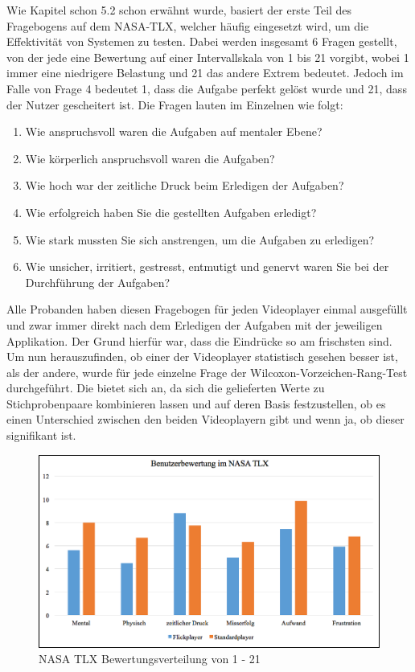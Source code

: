 \documentclass[11pt,a4paper]{report}
\begin{document}
Wie Kapitel schon 5.2 schon erwähnt wurde, basiert der erste Teil des Fragebogens auf dem NASA-TLX, welcher häufig eingesetzt wird, um die Effektivität von Systemen zu testen. Dabei werden insgesamt 6 Fragen gestellt, von der jede eine Bewertung auf einer Intervallskala von 1 bis 21 vorgibt, wobei 1 immer eine niedrigere Belastung und 21 das andere Extrem bedeutet. Jedoch im Falle von Frage 4 bedeutet 1, dass die Aufgabe perfekt gelöst wurde und 21, dass der Nutzer gescheitert ist. Die Fragen lauten im Einzelnen wie folgt:
\begin{enumerate}
\item	Wie anspruchsvoll waren die Aufgaben auf mentaler Ebene?
\item	Wie körperlich anspruchsvoll waren die Aufgaben?
\item	Wie hoch war der zeitliche Druck beim Erledigen der Aufgaben?
\item	Wie erfolgreich haben Sie die gestellten Aufgaben erledigt?
\item	Wie stark mussten Sie sich anstrengen, um die Aufgaben zu erledigen?
\item	Wie unsicher, irritiert, gestresst, entmutigt und genervt waren Sie bei der Durchführung der Aufgaben?
\end{enumerate}
Alle Probanden haben diesen Fragebogen für jeden Videoplayer einmal ausgefüllt und zwar immer direkt nach dem Erledigen der Aufgaben mit der jeweiligen Applikation. Der Grund hierfür war, dass die Eindrücke so am frischsten sind. Um nun herauszufinden, ob einer der Videoplayer statistisch gesehen besser ist, als der andere, wurde für jede einzelne Frage der Wilcoxon-Vorzeichen-Rang-Test durchgeführt. Die bietet sich an, da sich die gelieferten Werte zu Stichprobenpaare kombinieren lassen und auf deren Basis festzustellen, ob es einen Unterschied zwischen den beiden Videoplayern gibt und wenn ja, ob dieser signifikant ist.
\begin{figure}[h]
\begin{center}
\includegraphics[scale=0.9]{./images/37.png}
\caption{NASA TLX Bewertungsverteilung von 1 - 21}
\label{nasa_tlx}
\end{center}
\end{figure}
\end{document}
